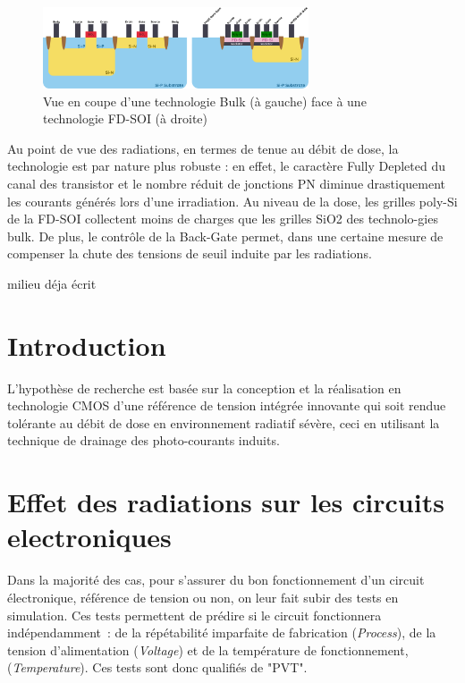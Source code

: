 \begin{figure}
    \centering
    \includegraphics[width=0.7\textwidth]{figures/FabBulkVsFdsoi.pdf}
    \caption{Vue en coupe d'une technologie Bulk (à gauche) face à une technologie FD-SOI (à droite)}
    \label{fig:bulk_vs_fdsoi}
\end{figure}
 

Au point de vue des radiations, en termes de tenue au débit de dose, la technologie est par nature plus robuste : en effet, le caractère Fully Depleted du canal des transistor et le nombre réduit de jonctions PN diminue drastiquement les courants générés lors d'une irradiation. Au niveau de la dose, les grilles poly-Si de la FD-SOI collectent moins de charges que les grilles SiO2 des technolo-gies bulk. De plus, le contrôle de la Back-Gate permet, dans une certaine mesure de compenser la chute des tensions de seuil induite par les radiations.

\begin{metsUneSource}
milieu déja écrit
\end{metsUneSource}


\section{Introduction}

L'hypothèse de recherche est basée sur la conception et la réalisation en technologie CMOS d'une référence de tension intégrée innovante qui soit rendue tolérante au débit de dose en environnement radiatif sévère, ceci en utilisant la technique de drainage des photo-courants induits.

\section{Effet des radiations sur les circuits electroniques}

Dans la majorité des cas, pour s’assurer du bon fonctionnement d’un circuit électronique, référence de tension ou non, on leur fait subir des tests en simulation. Ces tests permettent de prédire si le circuit fonctionnera indépendamment : de la répétabilité imparfaite de fabrication (\textit{Process}), de la tension d’alimentation (\textit{Voltage}) et de la température de fonctionnement, (\textit{Temperature}). Ces tests sont donc qualifiés de "PVT".

